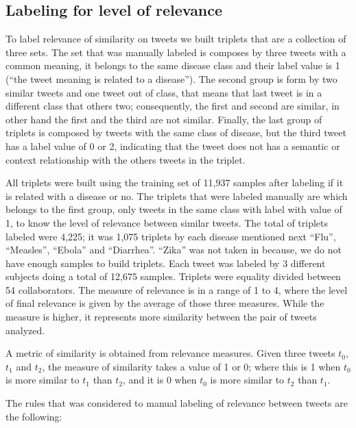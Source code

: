 \documentclass[12pt]{report}
\begin{document}
\subsection{Labeling for level of relevance} \label{data_relevance_labeling}

To label relevance of similarity on tweets we built triplets that are a collection of three sets. The set that was manually labeled is composes by three tweets with a common meaning, it belongs to the same disease class and their label value is 1 (``the tweet meaning is related to a disease''). The second group is form by two similar tweets and one tweet out of class, that means that last tweet is in a different class that others two; consequently, the first and second are similar, in other hand the first and the third are not similar. Finally, the last group of triplets is composed by tweets with the same class of disease, but the third tweet has a label value of 0 or 2, indicating that the tweet does not has a semantic or context relationship with the others tweets in the triplet.

All triplets were built using the training set of 11,937 samples after labeling if it is related with a disease or no. The triplets that were labeled manually are which belongs to the first group, only tweets in the same class with label with value of 1, to know the level of relevance between similar tweets. The total of triplets labeled were 4,225; it was 1,075 triplets by each disease mentioned next ``Flu'', ``Measles'', ``Ebola'' and ``Diarrhea''. ``Zika'' was not taken in because, we do not have enough samples to build triplets. Each tweet was labeled by 3 different subjects doing a total of 12,675 samples. Triplets were equality divided between 54 collaborators.  The measure of relevance is in a range of 1 to 4, where the level of final relevance is given by the average of those three measures. While the measure is higher, it represents more similarity between the pair of tweets analyzed. 

A metric of similarity is obtained from relevance measures. Given three tweets $t_0$, $t_1$ and $t_2$, the measure of similarity takes a value of 1 or 0; where this is 1 when $t_0$ is more similar to $t_1$ than $t_2$, and it is 0 when $t_0$ is more similar to $t_2$ than $t_1$.

The rules that was considered to manual labeling of relevance between tweets are the following:
\end{document}
